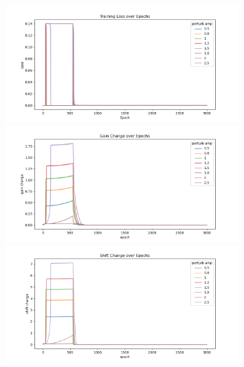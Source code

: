 \documentclass[12pt, a4paper]{article}
\begin{document}
\begin{figure}[H]
    \centering
    \includegraphics[width=0.8\textwidth]{baseline_abb05/fig/0221_abb05_perturbamp_loss.png} \\
    \includegraphics[width=0.8\textwidth]{baseline_abb05/fig/0221_abb05_perturbamp_gc.png} \\
    \includegraphics[width=0.8\textwidth]{baseline_abb05/fig/0221_abb05_perturbamp_sc.png} \\
\end{figure}
\end{document}
